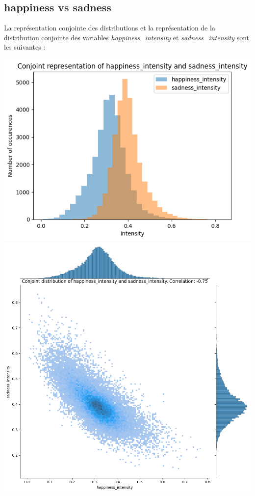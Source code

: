 \documentclass{article}
\begin{document}
\subsection*{happiness vs sadness}

La représentation conjointe des distributions et la représentation de la
distribution conjointe des variables
\textit{happiness\_intensity} et \textit{sadness\_intensity}
sont les suivantes :

\begin{center}
    \includegraphics[scale=0.39]{./img/conjoint_representation_happiness_intensity_sadness_intensity.png}
    \includegraphics[scale=0.23]{./img/conjoint_distribution_happiness_intensity_sadness_intensity.png}
\end{center}
\end{document}
